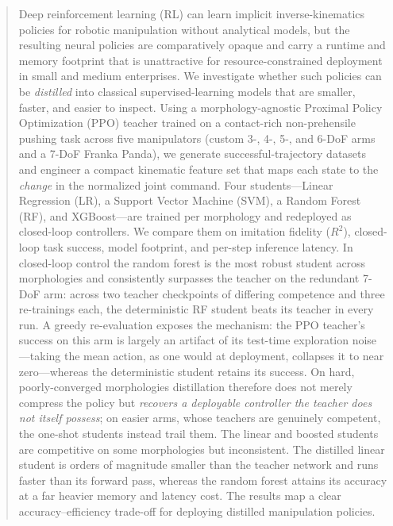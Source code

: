 \documentclass[conference]{IEEEtran}
\begin{document}
\begin{abstract}
Deep reinforcement learning (RL) can learn implicit inverse-kinematics policies
for robotic manipulation without analytical models, but the resulting neural
policies are comparatively opaque and carry a runtime and memory footprint that
is unattractive for resource-constrained deployment in small and medium
enterprises. We investigate whether such policies can be \emph{distilled} into
classical supervised-learning models that are smaller, faster, and easier to
inspect. Using a morphology-agnostic Proximal Policy Optimization (PPO) teacher
trained on a contact-rich non-prehensile pushing task across five manipulators
(custom 3-, 4-, 5-, and 6-DoF arms and a 7-DoF Franka Panda), we generate
successful-trajectory datasets and engineer a compact kinematic feature set that
maps each state to the \emph{change} in the normalized joint command. Four
students---Linear Regression (LR), a Support Vector Machine (SVM), a Random
Forest (RF), and XGBoost---are trained per morphology and redeployed as
closed-loop controllers. We compare them on imitation fidelity ($R^2$),
closed-loop task success, model footprint, and per-step inference latency. In
closed-loop control the random forest is the most robust student across
morphologies and consistently surpasses the teacher on the redundant 7-DoF arm:
across two teacher checkpoints of differing competence and three re-trainings
each, the deterministic RF student beats its teacher in every run. A greedy
re-evaluation exposes the mechanism: the PPO teacher's success on this arm is
largely an artifact of its test-time exploration noise---taking the mean action,
as one would at deployment, collapses it to near zero---whereas the deterministic
student retains its success. On hard, poorly-converged morphologies distillation
therefore does not merely compress the policy but \emph{recovers a deployable
controller the teacher does not itself possess}; on easier arms, whose teachers
are genuinely competent, the one-shot students instead trail them. The linear and
boosted students are competitive on some morphologies but inconsistent. The distilled linear student is orders of magnitude smaller than
the teacher network and runs faster than its forward pass, whereas the random
forest attains its accuracy at a far heavier memory and latency cost. The
results map a clear accuracy--efficiency trade-off for deploying distilled
manipulation policies.
\end{abstract}
\end{document}
